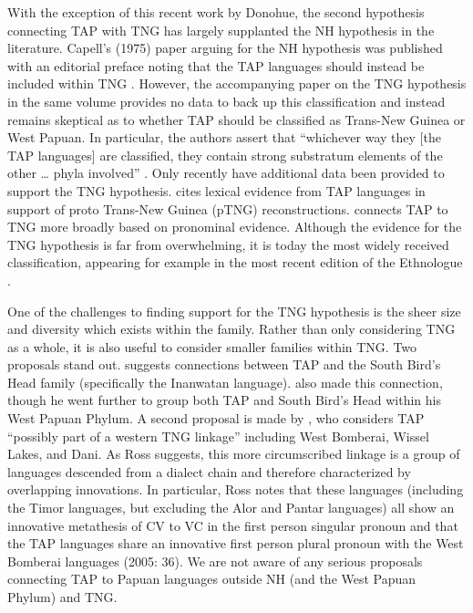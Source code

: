 With the exception of this recent work by Donohue, the second hypothesis connecting TAP with TNG has largely supplanted the NH hypothesis in the literature. Capell's (1975) paper arguing for the NH hypothesis was published with an editorial preface noting that the TAP languages should instead be included within TNG \citep[667]{Wurm1975}. However, the accompanying paper on the TNG hypothesis in the same volume provides no data to back up this classification and instead remains skeptical as to whether TAP should be classified as Trans-New Guinea or West Papuan. In particular, the authors assert that ``whichever way they [the TAP languages] are classified, they contain strong substratum elements of the other {\dots} phyla involved'' \citep[318]{WurmEtAl1975}. Only recently have additional data been provided to support the TNG hypothesis. \citet{Pawley2001} cites lexical evidence from TAP languages in support of proto Trans-New Guinea (pTNG) reconstructions. \citet{Ross2005} connects TAP to TNG more broadly based
on pronominal evidence. Although the evidence for the TNG hypothesis is far from overwhelming, it is today the most widely received classification, appearing for example in the most recent edition of the Ethnologue \citep{LewisEtAl2013}.

One of the challenges to finding support for the TNG hypothesis is the sheer size and diversity which exists within the family. Rather than only considering TNG as a whole, it is also useful to consider smaller families within TNG. Two proposals stand out. \citet{Reesink1996} suggests connections between TAP and the South Bird's Head family (specifically the Inanwatan language). \citet{Cowan1953} also made this connection, though he went further to group both TAP and South Bird's Head within his West Papuan Phylum. A second proposal is made by \citet{Ross2005}, who considers TAP ``possibly part of a western TNG linkage'' including West Bomberai, Wissel Lakes, and Dani. As Ross suggests, this more circumscribed linkage is a group of languages descended from a dialect chain and therefore characterized by overlapping innovations. In particular, Ross notes that these languages (including the Timor languages, but excluding the Alor and Pantar languages) all show an innovative metathesis of CV to VC in the first
person singular pronoun and that the TAP languages share an innovative first person plural pronoun with the West Bomberai languages (2005: 36). We are not aware of any serious proposals connecting TAP to Papuan languages outside NH (and the West Papuan Phylum) and TNG.

